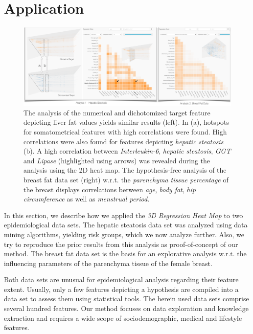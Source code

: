 \documentclass[journal]{style/vgtc} 			          %
\begin{document}
\section{Application} \label{application}
\begin{figure}[htb]
 \centering
 \includegraphics[width=1.0\linewidth]{figures/application}
 \caption{
 The analysis of the numerical and dichotomized target feature depicting liver fat values yields similar results (left).
 In (a), hotspots for somatometrical features with high correlations were found.
 High correlations were also found for features depicting \emph{hepatic steatosis} (b).
 A high correlation between \emph{Interleukin-6}, \emph{hepatic steatosis}, \emph{GGT} and \emph{Lipase} (highlighted using arrows) was revealed during the analysis using the 2D heat map.
 The hypothesis-free analysis of the breast fat data set (right) w.r.t. the \emph{parenchyma tissue percentage} of the breast displays correlations between \emph{age}, \emph{body fat}, \emph{hip circumference} as well as \emph{menstrual period}.
 }
  \label{fig:Application}
\end{figure}
In this section, we describe how we applied the \emph{3D Regression Heat Map} to two epidemiological data sets.
The hepatic steatosis data set was analyzed using data mining algorithms, yielding risk groups, which we now analyze further.
Also, we try to reproduce the prior results from this analysis as proof-of-concept of our method.
The breast fat data set is the basis for an explorative analysis w.r.t. the influencing parameters of the parenchyma tissue of the female breast.

Both data sets are unusual for epidemiological analysis regarding their feature extent.
Usually, only a few features depicting a hypothesis are compiled into a data set to assess them using statistical tools.
The herein used data sets comprise several hundred features.
Our method focuses on data exploration and knowledge extraction and requires a wide scope of sociodemographic, medical and lifestyle features.
\end{document}
